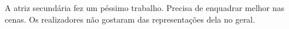 \documentclass{article}
\begin{document}
A atriz secundária fez um péssimo trabalho. Precisa de enquadrar melhor nas cenas.
Os realizadores não gostaram das representações dela no geral.
\end{document}
